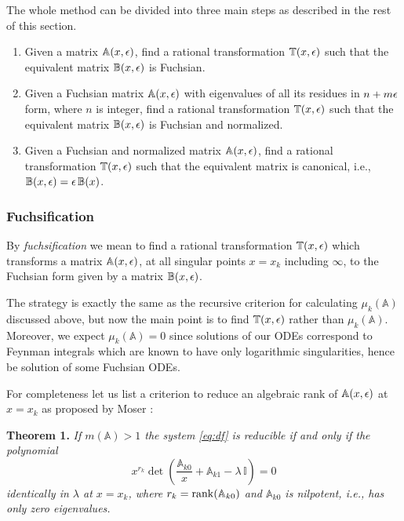 \documentclass[12pt,a4paper]{article}
\def\M#1{\mathbb{#1}} %
\begin{document}
The whole method can be divided into three main steps as described in the rest of this section.

\begin{enumerate}
  \item Given a matrix $\M A(x,\eps)$, find a rational transformation $\M T(x,\eps)$ such that the equivalent matrix $\M B(x,\eps)$ is Fuchsian.
  \item Given a Fuchsian matrix $\M A(x,\eps)$ with eigenvalues of all its residues in  $n+m\epsilon$ form, where $n$ is integer, find a rational transformation $\M T(x,\eps)$ such that the equivalent matrix $\M B(x,\eps)$ is Fuchsian and normalized.
  \item Given a Fuchsian and normalized matrix $\M A(x,\eps)$, find a rational transformation $\M T(x,\eps)$ such that the equivalent matrix is canonical, i.e., $\M B(x,\eps) = \eps \, \M B(x)$.
\end{enumerate}


\subsubsection{Fuchsification}
\label{sec:fuchs}

By {\em fuchsification} we mean to find a rational transformation $\M T(x,\eps)$ which transforms a matrix $\M A(x,\eps)$, at all singular points $x=x_k$ including $\infty$, to the Fuchsian form given by a matrix $\M B(x,\eps)$.

The strategy is exactly the same as the recursive criterion for calculating $\mu_k(\M A)$ discussed above, but now the main point is to find $\M T(x,\eps)$ rather than $\mu_k(\M A)$.
Moreover, we expect $\mu_k(\M A) = 0$ since solutions of our ODEs correspond to Feynman integrals which are known to have only logarithmic singularities, hence be solution of some Fuchsian ODEs.

For completeness let us list a criterion to reduce an algebraic rank of $\M A(x,\eps)$ at $x=x_k$ as proposed by Moser \cite{Mos59}:

\textbf{Theorem 1.}
{\em If $m(\M A) > 1$ the system \eqref{eq:df} is reducible if and only if the polynomial}
\begin{equation}
\label{eq:red_cond}
  x^{r_k} \det\left(\frac{\M A_{k0}}{x} + \M A_{k1} - \lambda \,\M I\right) = 0
\end{equation}
{\em identically in $\lambda$ at $x=x_k$, where $r_k=\rank(\M A_{k0})$ and $\M A_{k0}$ is nilpotent, i.e., has only zero eigenvalues.}
\end{document}

